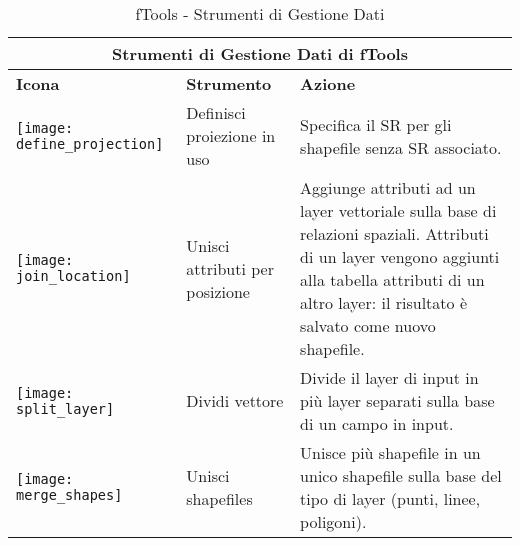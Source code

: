 \begin{table}[ht]
\centering
\begin{tabular}{|m{1cm}|m{3cm}|m{12cm}|}
 \hline \multicolumn{3}{|c|}{\textbf{Strumenti di Gestione Dati di fTools}} \\
 \hline \textbf{Icona} & \textbf{Strumento} & \textbf{Azione} \\
 \hline \texttt{[image: define\_projection]} & Definisci proiezione in uso & 
Specifica il SR per gli shapefile senza SR associato. \\
 \hline \texttt{[image: join\_location]} & Unisci attributi per posizione & 
Aggiunge attributi ad un layer vettoriale sulla base di relazioni spaziali. Attributi di 
un layer vengono aggiunti alla tabella attributi di un altro layer: il risultato è 
salvato come nuovo shapefile. \\
 \hline \texttt{[image: split\_layer]} & Dividi vettore & 
Divide il layer di input in più layer separati sulla base di un campo in input. \\
 \hline \texttt{[image: merge\_shapes]} & Unisci shapefiles &
Unisce più shapefile in un unico shapefile sulla base del tipo di layer (punti, linee, poligoni). \\
 \hline
\end{tabular}
\caption{fTools - Strumenti di Gestione Dati}\label{tab:fTool_data_management}
\end{table}

\FloatBarrier
